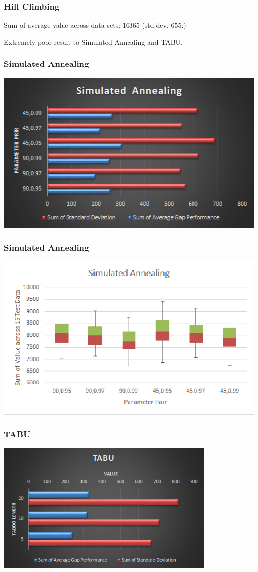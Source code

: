 \documentclass{beamer}
\begin{document}

\begin{frame}
	\frametitle{Hill Climbing}
	Sum of average value across data sets: {\color{red} $16365$} (std.dev. $655$.)
	
	Extremely poor result to Simulated Annealing and TABU.
\end{frame}

\begin{frame}
\frametitle{Simulated Annealing}
 \centerline{\includegraphics[width=1.0\textwidth]{simulated_annealing.png}}
\end{frame}
\begin{frame}
\frametitle{Simulated Annealing}
 \centerline{\includegraphics[width=1.0\textwidth]{simulated_annealing2.png}}
\end{frame}
\begin{frame}
\frametitle{TABU}
 \centerline{\includegraphics[width=0.8\textwidth]{TABU.png}}
\end{frame}
\end{document}
